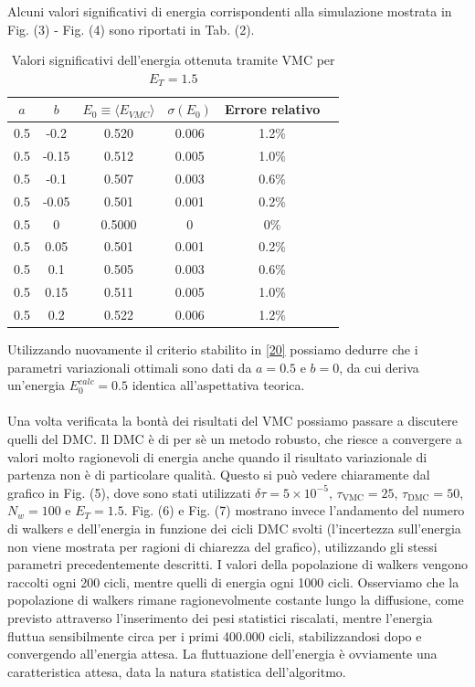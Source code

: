 \documentclass[11pt,a4paper]{article}
\begin{document}
Alcuni valori significativi di energia corrispondenti alla simulazione mostrata in Fig. (3) - Fig. (4) sono riportati in Tab. (2).  
\begin{table}
\centering
\begin{tabular}{|c|c|c|c|c|c|}
\hline
$a$ & $b$ &$E_0 \equiv \langle E_{VMC}\rangle$ & $\sigma(E_0)$ & Errore relativo \\ \hline
0.5 &	 -0.2& 	 0.520 &	 0.006 & 1.2$\%$ \\ \hline
0.5  & -0.15 	& 0.512 &	 0.005 & 1.0$\%$ \\ \hline
0.5 	& -0.1 	 &0.507 	& 0.003 & 0.6$\%$ \\ \hline
0.5 	& -0.05 &	 0.501 &	 0.001 & 0.2$\%$ \\ \hline
0.5 	& 0 & 	 0.5000 	& 0 & 0$\%$ \\ \hline
0.5 	& 0.05 & 	 0.501 &	 0.001 & 0.2$\%$ \\ \hline
0.5 	& 0.1 	& 0.505 	& 0.003& 0.6$\%$ \\ \hline
0.5 	& 0.15 	& 0.511 &	 0.005 & 1.0$\%$ \\ \hline
0.5 	& 0.2 	& 0.522 	& 0.006 & 1.2$\%$ \\ \hline
\end{tabular}
\caption{Valori significativi dell'energia ottenuta tramite VMC per $E_T=1.5$}
\end{table}
Utilizzando nuovamente il criterio stabilito in \eqref{20} possiamo dedurre che i parametri variazionali ottimali sono dati da $a=0.5$ e $b=0$, da cui deriva un'energia $E_0^{calc}=0.5$ identica all'aspettativa teorica. \\ \\
Una volta verificata la bontà dei risultati del VMC possiamo passare a discutere quelli del DMC. Il DMC è di per sè un metodo robusto, che riesce a convergere a valori molto ragionevoli di energia anche quando il risultato variazionale di partenza non è di particolare qualità. Questo si può vedere chiaramente dal grafico in Fig. (5), dove sono stati utilizzati $\delta\tau = 5\times 10^{-5}$, $\tau_{\text{VMC}}=25$, $\tau_{\text{DMC}}=50$, $N_w = 100$ e $E_T=1.5$. Fig. (6) e Fig. (7) mostrano invece l'andamento del numero di walkers e dell'energia in funzione dei cicli DMC svolti (l'incertezza sull'energia non viene mostrata per ragioni di chiarezza del grafico), utilizzando gli stessi parametri precedentemente descritti. I valori della popolazione di walkers vengono raccolti ogni 200 cicli, mentre quelli di energia ogni 1000 cicli. Osserviamo che la popolazione di walkers rimane ragionevolmente costante lungo la diffusione, come previsto attraverso l'inserimento dei pesi statistici riscalati, mentre l'energia fluttua sensibilmente circa per i primi 400.000 cicli, stabilizzandosi dopo e convergendo all'energia attesa. La fluttuazione dell'energia è ovviamente una caratteristica attesa, data la natura statistica dell'algoritmo. 
\end{document}
